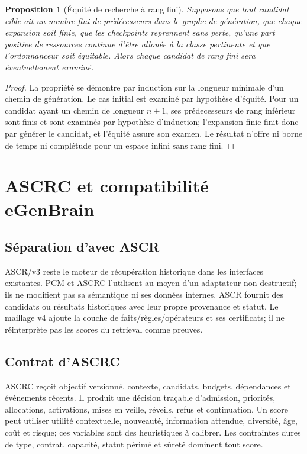 \documentclass[11pt,a4paper,openany]{book}
\theoremstyle{definition}
\theoremstyle{plain}
\newtheorem{proposition}[definition]{Proposition}
\theoremstyle{remark}
\begin{document}
\begin{proposition}[Équité de recherche à rang fini]
Supposons que tout candidat cible ait un nombre fini de prédécesseurs dans le graphe de génération, que chaque expansion soit finie, que les checkpoints reprennent sans perte, qu'une part positive de ressources continue d'être allouée à la classe pertinente et que l'ordonnanceur soit équitable. Alors chaque candidat de rang fini sera éventuellement examiné.
\end{proposition}
\begin{proof}
La propriété se démontre par induction sur la longueur minimale d'un chemin de génération. Le cas initial est examiné par hypothèse d'équité. Pour un candidat ayant un chemin de longueur $n+1$, ses prédecesseurs de rang inférieur sont finis et sont examinés par hypothèse d'induction; l'expansion finie finit donc par générer le candidat, et l'équité assure son examen. Le résultat n'offre ni borne de temps ni complétude pour un espace infini sans rang fini.
\end{proof}

\chapter{ASCRC et compatibilité eGenBrain}
\section{Séparation d'avec ASCR}
ASCR/v3 reste le moteur de récupération historique dans les interfaces existantes. PCM et ASCRC l'utilisent au moyen d'un adaptateur non destructif; ils ne modifient pas sa sémantique ni ses données internes. ASCR fournit des candidats ou résultats historiques avec leur propre provenance et statut. Le maillage v4 ajoute la couche de faits/règles/opérateurs et ses certificats; il ne réinterprète pas les scores du retrieval comme preuves.

\section{Contrat d'ASCRC}
ASCRC reçoit objectif versionné, contexte, candidats, budgets, dépendances et événements récents. Il produit une décision traçable d'admission, priorités, allocations, activations, mises en veille, réveils, refus et continuation. Un score peut utiliser utilité contextuelle, nouveauté, information attendue, diversité, âge, coût et risque; ces variables sont des heuristiques à calibrer. Les contraintes dures de type, contrat, capacité, statut périmé et sûreté dominent tout score.
\end{document}
